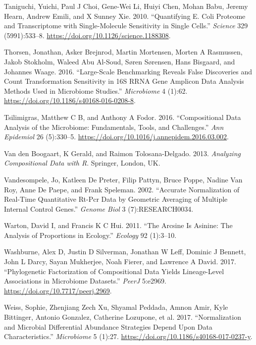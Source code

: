 \documentclass[onecolumn]{book}
\theoremstyle{definition}
\theoremstyle{definition}
\theoremstyle{definition}
\theoremstyle{remark}
\begin{document}
\leavevmode\hypertarget{ref-Taniguchi:2010aa}{}%
Taniguchi, Yuichi, Paul J Choi, Gene-Wei Li, Huiyi Chen, Mohan Babu,
Jeremy Hearn, Andrew Emili, and X Sunney Xie. 2010. ``Quantifying E.
Coli Proteome and Transcriptome with Single-Molecule Sensitivity in
Single Cells.'' \emph{Science} 329 (5991):533--8.
\url{https://doi.org/10.1126/science.1188308}.

\leavevmode\hypertarget{ref-Thorsen:2016aa}{}%
Thorsen, Jonathan, Asker Brejnrod, Martin Mortensen, Morten A Rasmussen,
Jakob Stokholm, Waleed Abu Al-Soud, Søren Sørensen, Hans Bisgaard, and
Johannes Waage. 2016. ``Large-Scale Benchmarking Reveals False
Discoveries and Count Transformation Sensitivity in 16S RRNA Gene
Amplicon Data Analysis Methods Used in Microbiome Studies.''
\emph{Microbiome} 4 (1):62.
\url{https://doi.org/10.1186/s40168-016-0208-8}.

\leavevmode\hypertarget{ref-Tsilimigras:2016aa}{}%
Tsilimigras, Matthew C B, and Anthony A Fodor. 2016. ``Compositional
Data Analysis of the Microbiome: Fundamentals, Tools, and Challenges.''
\emph{Ann Epidemiol} 26 (5):330--5.
\url{https://doi.org/10.1016/j.annepidem.2016.03.002}.

\leavevmode\hypertarget{ref-van2013}{}%
Van den Boogaart, K Gerald, and Raimon Tolosana-Delgado. 2013.
\emph{Analyzing Compositional Data with R}. Springer, London, UK.

\leavevmode\hypertarget{ref-Vandesompele:2002aa}{}%
Vandesompele, Jo, Katleen De Preter, Filip Pattyn, Bruce Poppe, Nadine
Van Roy, Anne De Paepe, and Frank Speleman. 2002. ``Accurate
Normalization of Real-Time Quantitative Rt-Pcr Data by Geometric
Averaging of Multiple Internal Control Genes.'' \emph{Genome Biol} 3
(7):RESEARCH0034.

\leavevmode\hypertarget{ref-Warton:2011aa}{}%
Warton, David I, and Francis K C Hui. 2011. ``The Arcsine Is Asinine:
The Analysis of Proportions in Ecology.'' \emph{Ecology} 92 (1):3--10.

\leavevmode\hypertarget{ref-Washburne:2017aa}{}%
Washburne, Alex D, Justin D Silverman, Jonathan W Leff, Dominic J
Bennett, John L Darcy, Sayan Mukherjee, Noah Fierer, and Lawrence A
David. 2017. ``Phylogenetic Factorization of Compositional Data Yields
Lineage-Level Associations in Microbiome Datasets.'' \emph{PeerJ}
5:e2969. \url{https://doi.org/10.7717/peerj.2969}.

\leavevmode\hypertarget{ref-Weiss:2017aa}{}%
Weiss, Sophie, Zhenjiang Zech Xu, Shyamal Peddada, Amnon Amir, Kyle
Bittinger, Antonio Gonzalez, Catherine Lozupone, et al. 2017.
``Normalization and Microbial Differential Abundance Strategies Depend
Upon Data Characteristics.'' \emph{Microbiome} 5 (1):27.
\url{https://doi.org/10.1186/s40168-017-0237-y}.
\end{document}

